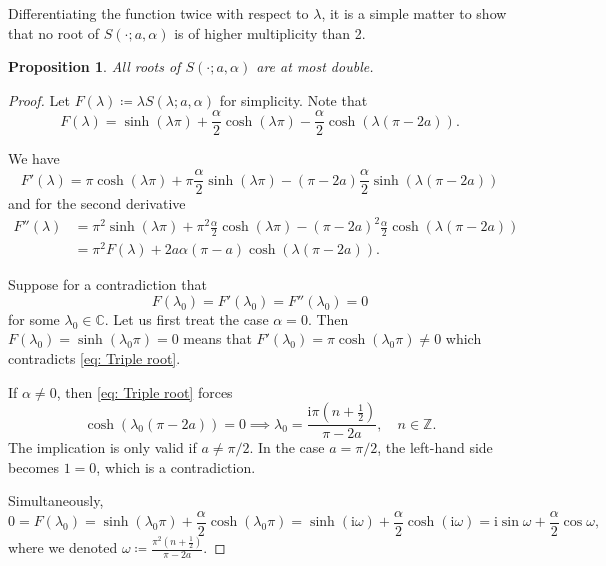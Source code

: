 \documentclass[11pt, a4paper,reqno]{amsart}
\theoremstyle{plain}
\newtheorem{proposition}[theorem]{Proposition}
\theoremstyle{definition}
\theoremstyle{remark}
\newcommand{\1}{\mathds 1}
\begin{document}
Differentiating the function twice with respect to $\lambda$, it is a simple matter to show that no root of $S(\cdot; a, \alpha)$ is of higher multiplicity than 2.

\begin{proposition}\label{P: Roots at most double}
    All roots of $S(\cdot; a, \alpha)$ are at most double.
\end{proposition}
\begin{proof}
    Let $F(\lambda) \coloneqq \lambda S(\lambda; a, \alpha)$ for simplicity. Note that
    \[
    F(\lambda) = \sinh(\lambda\pi) + \frac{\alpha}{2}\cosh(\lambda\pi)-\frac{\alpha}{2}\cosh(\lambda(\pi-2a)).
    \]

    We have
    \begin{equation}
    F'(\lambda) = \pi\cosh(\lambda\pi) + \pi\frac{\alpha}{2}\sinh(\lambda\pi) - (\pi-2a)\frac{\alpha}{2}\sinh(\lambda(\pi-2a))
    \label{FDerivative}
    \end{equation}
    and for the second derivative
    \begin{align*}
    F''(\lambda) &= \pi^2\sinh(\lambda\pi) + \pi^2 \frac{\alpha}{2}\cosh(\lambda\pi) -(\pi-2a)^2\frac{\alpha}{2}\cosh(\lambda(\pi-2a)) \\
    &= \pi^2F(\lambda) + 2a\alpha(\pi-a)\cosh(\lambda(\pi-2a)).
    \end{align*}

    Suppose for a contradiction that 
    \begin{equation}
    F(\lambda_0) = F'(\lambda_0) = F''(\lambda_0) = 0
    \label{eq: Triple root}
    \end{equation}
    for some $\lambda_0 \in \mathbb C$. Let us first treat the case $\alpha = 0$. Then $F(\lambda_0) = \sinh(\lambda_0\pi) = 0$ means that $F'(\lambda_0) = \pi\cosh(\lambda_0\pi) \neq 0$ which contradicts \eqref{eq: Triple root}.
    
    
    If $\alpha \neq 0$, then \eqref{eq: Triple root} forces 
    \[
    \cosh(\lambda_0(\pi-2a)) = 0 \implies \lambda_0 = \frac{\mathrm{i}\pi\left(n + \frac{1}{2}\right)}{\pi - 2a}, \quad n \in \mathbb Z.
    \]
    The implication is only valid if $a \neq \pi/2$. In the case $a=\pi/2$, the left-hand side becomes $1=0$, which is a contradiction.


    Simultaneously,
    \begin{equation}
    0 = F(\lambda_0) = \sinh(\lambda_0\pi) + \frac{\alpha}{2}\cosh(\lambda_0\pi) = \sinh(\mathrm{i}\omega) + \frac{\alpha}{2}\cosh(\mathrm{i}\omega) = \mathrm{i}\sin\omega + \frac{\alpha}{2}\cos\omega,
    \label{DoubleEigenvaluesProof}
    \end{equation}
    where we denoted $\omega \coloneqq \frac{\pi^2\left(n + \frac{1}{2}\right)}{\pi-2a}$.


\end{proof}
\end{document}
